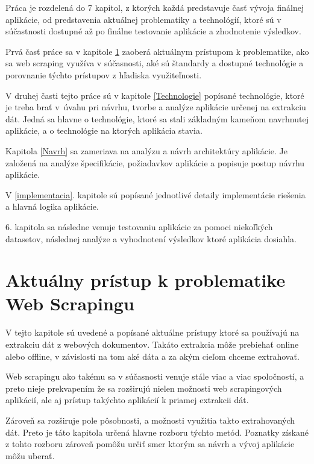 \newpage

Práca je rozdelená do 7 kapitol, z ktorých každá predstavuje časť vývoja finálnej aplikácie, od predstavenia aktuálnej problematiky a technológií, ktoré sú v súčastnosti dostupné až po finálne testovanie aplikácie a zhodnotenie výsledkov.

\bigskip

Prvá časť práce sa v kapitole \ref{aktualny_pristup} zaoberá aktuálnym prístupom k problematike, ako sa web scraping využíva v súčasnosti, aké sú štandardy a dostupné technológie a porovnanie týchto prístupov z hľadiska využiteľnosti.

V druhej časti tejto práce sú v kapitole \ref{Technologie} popísané technológie, ktoré je treba brať \mbox{v úvahu} pri návrhu, tvorbe a analýze aplikácie určenej na extrakciu dát. Jedná sa hlavne o technológie, ktoré sa stali základným kameňom navrhnutej aplikácie, a o technológie na ktorých aplikácia stavia.

Kapitola \ref{Navrh} sa zameriava na analýzu a návrh architektúry aplikácie. Je založená na analýze špecifikácie, požiadavkov aplikácie a popisuje postup návrhu aplikácie.

V \ref{implementacia}. kapitole sú popísané jednotlivé detaily implementácie riešenia a hlavná logika aplikácie.

6. kapitola sa následne venuje testovaniu aplikácie za pomoci niekoľkých datasetov, následnej analýze a vyhodnotení výsledkov ktoré aplikácia dosiahla.


\chapter{Aktuálny prístup k problematike Web Scrapingu}
\label{aktualny_pristup}

V tejto kapitole sú uvedené a popísané aktuálne prístupy ktoré sa používajú na extrakciu dát z webových dokumentov. Takáto extrakcia môže prebiehať online alebo offline, v závislosti na tom aké dáta a za akým cieľom chceme extrahovať.

Web scrapingu ako takému sa v súčasnosti venuje stále viac a viac spoločností, a preto nieje prekvapením že sa rozširujú nielen možnosti web scrapingových aplikácií, ale aj prístup takýchto aplikácií k priamej extrakcii dát.

Zároveň sa rozširuje pole pôsobnosti, a možnosti využitia takto extrahovaných dát. Preto je táto kapitola určená hlavne rozboru týchto metód. Poznatky získané z tohto rozboru zároveň pomôžu určiť smer ktorým sa návrh a vývoj aplikácie môžu uberať. 

